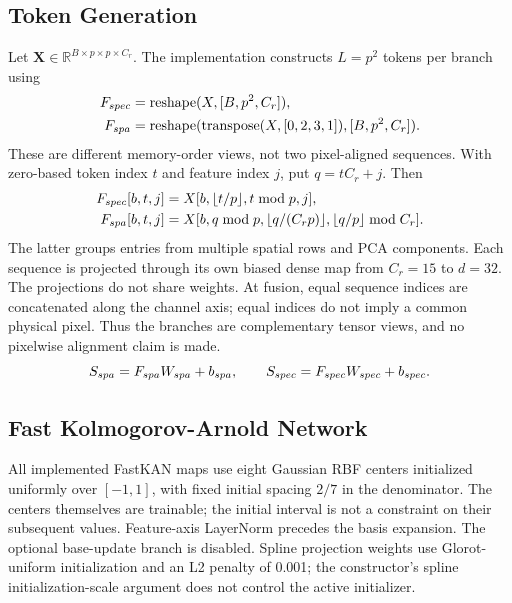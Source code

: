 \documentclass{revision_assets/ieeeaccess_revision}
\newif\ifrevisionhighlights
\newenvironment{revision}{\ifrevisionhighlights\begin{shaded*}\fi}{\ifrevisionhighlights\end{shaded*}\fi}
\begin{document}
\subsection{Token Generation}
\label{sec:token_details}
\begin{revision}
Let $\mathbf X\in\mathbb R^{B\times p\times p\times C_r}$. The implementation constructs $L=p^2$ tokens per branch using
\begin{equation}
\begin{aligned}
F_{\rm spec}&=\operatorname{reshape}(X,[B,p^2,C_r]),\\
F_{\rm spa}&=\operatorname{reshape}(\operatorname{transpose}(X,[0,2,3,1]),[B,p^2,C_r]).
\end{aligned}
\label{eq:patch_tokens}
\end{equation}
These are different memory-order views, not two pixel-aligned sequences. With zero-based token index $t$ and feature index $j$, put $q=tC_r+j$. Then
\begin{equation}
\begin{aligned}
F_{\rm spec}[b,t,j]&=X[b,\lfloor t/p\rfloor,t\bmod p,j],\\
F_{\rm spa}[b,t,j]&=X[b,q\bmod p,\lfloor q/(C_rp)\rfloor,\lfloor q/p\rfloor\bmod C_r].
\end{aligned}
\end{equation}
The latter groups entries from multiple spatial rows and PCA components. Each sequence is projected through its own biased dense map from $C_r=15$ to $d=32$. The projections do not share weights. At fusion, equal sequence indices are concatenated along the channel axis; equal indices do not imply a common physical pixel. Thus the branches are complementary tensor views, and no pixelwise alignment claim is made.
\begin{equation}
S_{\rm spa}=F_{\rm spa}W_{\rm spa}+b_{\rm spa},\qquad
S_{\rm spec}=F_{\rm spec}W_{\rm spec}+b_{\rm spec}.
\label{eq:tokens}
\end{equation}
\end{revision}
\subsection{Fast Kolmogorov-Arnold Network}
\label{sec:fastkan}
\begin{revision}
All implemented FastKAN maps use eight Gaussian RBF centers initialized uniformly over $[-1,1]$, with fixed initial spacing $2/7$ in the denominator. The centers themselves are trainable; the initial interval is not a constraint on their subsequent values. Feature-axis LayerNorm precedes the basis expansion. The optional base-update branch is disabled. Spline projection weights use Glorot-uniform initialization and an L2 penalty of 0.001; the constructor's spline initialization-scale argument does not control the active initializer.
\end{revision}
\end{document}
